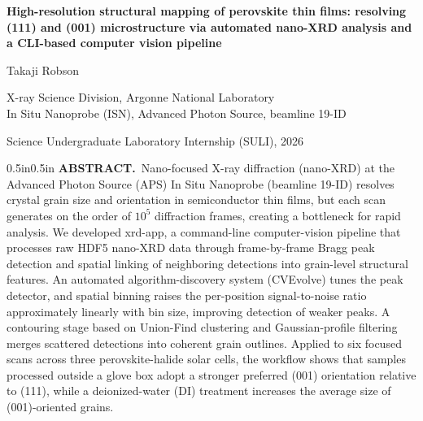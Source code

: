 \documentclass[12pt]{article}
\begin{document}
\thispagestyle{plain}
\vspace*{1.8in}
\begin{center}
{\large\bfseries High-resolution structural mapping of perovskite thin films:
resolving (111) and (001) microstructure via automated nano-XRD analysis and a
CLI-based computer vision pipeline\par}
\vspace{1.5em}
{\normalsize Takaji Robson\par}
\vspace{0.4em}
{\small X-ray Science Division, Argonne National Laboratory\\
In Situ Nanoprobe (ISN), Advanced Photon Source, beamline 19-ID\par}
\vspace{0.4em}
{\small Science Undergraduate Laboratory Internship (SULI), 2026\par}
\end{center}

\vspace{1.5em}
\begin{adjustwidth}{0.5in}{0.5in}
\noindent\textbf{ABSTRACT.}\ Nano-focused X-ray diffraction (nano-XRD) at the
Advanced Photon Source (APS) In Situ Nanoprobe (beamline 19-ID) resolves crystal
grain size and orientation in semiconductor thin films, but each scan generates
on the order of $10^5$ diffraction frames, creating a bottleneck for rapid
analysis. We developed xrd-app, a command-line computer-vision pipeline that
processes raw HDF5 nano-XRD data through frame-by-frame Bragg peak detection and
spatial linking of neighboring detections into grain-level structural features.
An automated algorithm-discovery system (CVEvolve) tunes the peak detector, and
spatial binning raises the per-position signal-to-noise ratio approximately
linearly with bin size, improving detection of weaker peaks. A contouring stage
based on Union-Find clustering and Gaussian-profile filtering merges scattered
detections into coherent grain outlines. Applied to six focused scans across
three perovskite-halide solar cells, the workflow shows that samples processed
outside a glove box adopt a stronger preferred (001) orientation relative to
(111), while a deionized-water (DI) treatment increases the average size of
(001)-oriented grains.
\end{adjustwidth}
\end{document}
